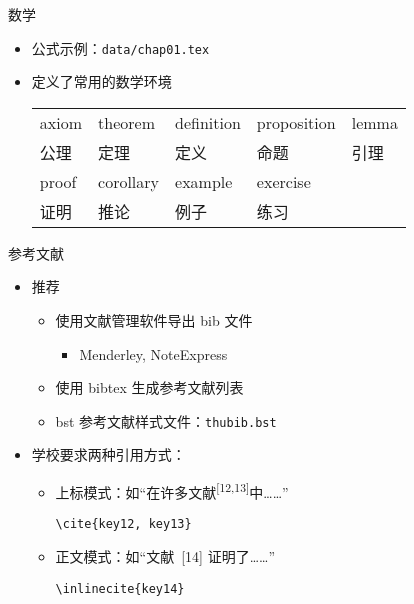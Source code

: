 \begin{frame}{数学}
  \begin{itemize}
    \item 公式示例：\nolinkurl{data/chap01.tex}
    \item \ThuThesis{} 定义了常用的数学环境
      \begin{table}[h]
        \centering
    \begin{tabular}{lllll}\hline
axiom & theorem & definition & proposition & lemma \\
公理 & 定理 & 定义 & 命题 & 引理 \\\hline
proof & corollary & example & exercise &\\
证明 & 推论 & 例子& 练习 &\\\hline
    \end{tabular}
      \end{table}
  \end{itemize}
\end{frame}

\begin{frame}[fragile]{参考文献}
  \begin{itemize}
    \item 推荐 \BibTeX
      \begin{itemize}
        \item 使用文献管理软件导出 bib 文件
          \begin{itemize}
            \item Menderley, NoteExpress
          \end{itemize}
        \item 使用 bibtex 生成参考文献列表
        \item bst 参考文献样式文件：\texttt{thubib.bst}
      \end{itemize}
    \item 学校要求两种引用方式：
      \begin{itemize}
        \item 上标模式：如``在许多文献\textsuperscript{[12,13]}中……''
        \begin{lstlisting}[basicstyle=\ttfamily]
  \cite{key12, key13}
        \end{lstlisting}
      \item 正文模式：如``文献~[14] 证明了……''
        \begin{lstlisting}[basicstyle=\ttfamily]
  \inlinecite{key14}
        \end{lstlisting}
      \end{itemize}
    \end{itemize}
\end{frame}

